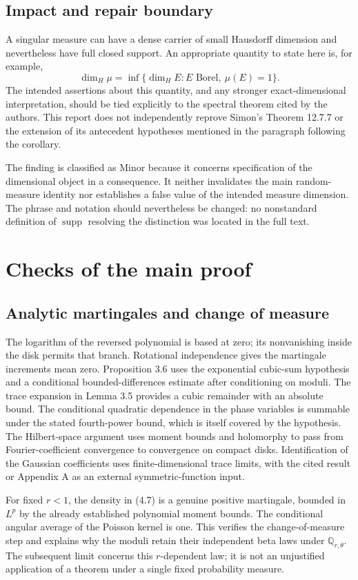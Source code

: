 \documentclass[10pt]{article}
\begin{document}
\subsection*{Impact and repair boundary}
A singular measure can have a dense carrier of small Hausdorff dimension and nevertheless have full closed support. An appropriate quantity to state here is, for example, \[\dim_H\mu=\inf\{\dim_H E:E\text{ Borel},\ \mu(E)=1\}.\] The intended assertions about this quantity, and any stronger exact-dimensional interpretation, should be tied explicitly to the spectral theorem cited by the authors. This report does not independently reprove Simon’s Theorem 12.7.7 or the extension of its antecedent hypotheses mentioned in the paragraph following the corollary.\par
The finding is classified as Minor because it concerns specification of the dimensional object in a consequence. It neither invalidates the main random-measure identity nor establishes a false value of the intended measure dimension. The phrase and notation should nevertheless be changed: no nonstandard definition of \(\operatorname{supp}\) resolving the distinction was located in the full text.\par
\section*{Checks of the main proof}
\subsection*{Analytic martingales and change of measure}
The logarithm of the reversed polynomial is based at zero; its nonvanishing inside the disk permits that branch. Rotational independence gives the martingale increments mean zero. Proposition 3.6 uses the exponential cubic-sum hypothesis and a conditional bounded-differences estimate after conditioning on moduli. The trace expansion in Lemma 3.5 provides a cubic remainder with an absolute bound. The conditional quadratic dependence in the phase variables is summable under the stated fourth-power bound, which is itself covered by the hypothesis. The Hilbert-space argument uses moment bounds and holomorphy to pass from Fourier-coefficient convergence to convergence on compact disks. Identification of the Gaussian coefficients uses finite-dimensional trace limits, with the cited result or Appendix A as an external symmetric-function input.\par
For fixed \(r<1\), the density in (4.7) is a genuine positive martingale, bounded in \(L^p\) by the already established polynomial moment bounds. The conditional angular average of the Poisson kernel is one. This verifies the change-of-measure step and explains why the moduli retain their independent beta laws under \(\mathbb Q_{r,\theta}\). The subsequent limit concerns this \(r\)-dependent law; it is not an unjustified application of a theorem under a single fixed probability measure.\par
\end{document}
